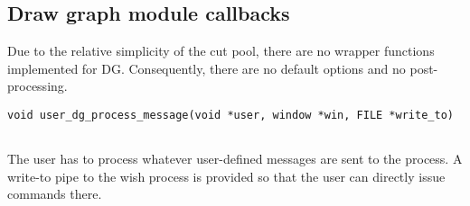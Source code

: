 
\subsection{Draw graph module callbacks}

Due to the relative simplicity of the cut pool, there are no wrapper
functions implemented for DG. Consequently, there are no default
options and no post-processing.

\bd


\begin{verbatim}
void user_dg_process_message(void *user, window *win, FILE *write_to)
			     
\end{verbatim}

\bd

\describe

The user has to process whatever user-defined messages are sent to the
process. A write-to pipe to the wish process is provided so that the
user can directly issue commands there.

\args

